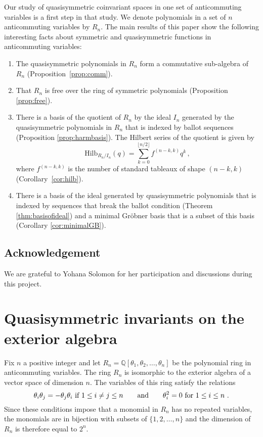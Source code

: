 \documentclass[submission]{FPSAC2023}
\theoremstyle{definition}
\numberwithin{equation}{section}
\begin{document}
Our study of quasisymmetric coinvariant spaces in one set of anticommuting variables is a first step in that study.  We denote polynomials in a set of $n$ anticommuting variables by $R_n$. The main results of this paper show the following interesting facts about symmetric and quasisymmetric functions in anticommuting variables:
\begin{enumerate}
\item The quasisymmetric polynomials in $R_n$ form a commutative sub-algebra of $R_n$ (Proposition~\ref{prop:comm}).
\item That $R_n$ is free over the ring of symmetric polynomials (Proposition \ref{prop:free}).
\item There is a basis of the quotient of $R_n$ by the ideal $I_n$ generated by the
quasisymmetric polynomials in $R_n$ that is indexed by ballot sequences (Proposition \ref{prop:harmbasis}).
The Hilbert series of the quotient is given by
\begin{equation}
    \label{eq:hilb}
   \text{Hilb}_{R_n/I_n}(q) = \sum_{k=0}^{\lfloor{n/2}\rfloor} f^{(n-k,k)} q^k\,,
\end{equation}
 where $f^{(n-k,k)}$ is the  number  of standard tableaux of shape $(n-k,k)$ (Corollary~\ref{cor:hilb}).
\item There is a basis of the ideal generated by quasisymmetric polynomials
that is indexed by sequences that break the ballot condition
(Theorem \ref{thm:basisofideal}) and a minimal Gr\"obner basis
that is a subset of this basis (Corollary \ref{cor:minimalGB}).
\end{enumerate}

\subsection{Acknowledgement} We are grateful to Yohana Solomon for her participation and discussions during this project.



\section{Quasisymmetric invariants on the exterior algebra}

Fix $n$ a positive integer and
let $R_n = {\mathbb Q}[\theta_1, \theta_2, \ldots, \theta_n]$ be the
polynomial ring in anticommuting variables.
The ring $R_n$ is isomorphic to the exterior algebra of a vector
space of dimension $n$.  The variables of this ring satisfy the relations
\[
\theta_i \theta_j = - \theta_j \theta_i \hbox{ if } 1 \leq i \neq j \leq n
\qquad\hbox{and}\qquad \theta_i^2 = 0 \hbox{ for }1 \leq i \leq n~.
\]
Since these conditions impose that a monomial in $R_n$ has no repeated variables,
the monomials are in bijection with subsets of $\{1,2,\ldots, n\}$
and the dimension of $R_n$ is therefore equal to $2^n$.
\end{document}
